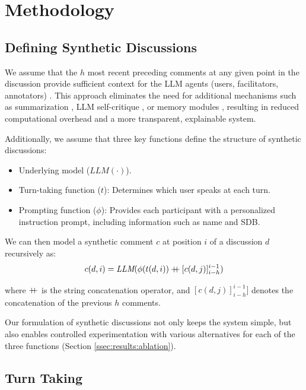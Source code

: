 %

\section{Methodology}
\label{sec:methodology}

\subsection{Defining Synthetic Discussions}
\label{ssec:methodology:discussions}

We assume that the $h$ most recent preceding comments at any given point in the discussion provide sufficient context for the \ac{LLM} agents (users, facilitators, annotators) \cite{pavlopoulos_2020_toxicity}. This approach eliminates the need for additional mechanisms such as summarization \cite{balog_2024}, \ac{LLM} self-critique \cite{yu_2024_fincon}, or memory modules \cite{Vezhnevets2023GenerativeAM}, resulting in reduced computational overhead and a more transparent, explainable system.

Additionally, we assume that three key functions define the structure of synthetic discussions:
\begin{itemize}[nosep, noitemsep]
    \item Underlying model ($\textit{LLM}(\cdot)$).
    \item Turn-taking function ($t$): Determines which user speaks at each turn.
    \item Prompting function ($\phi$): Provides each participant with a personalized instruction prompt, including information such as name and \ac{SDB}.
\end{itemize}

We can then model a synthetic comment $c$ at position $i$ of a discussion $d$ recursively as:
\begin{equation}
\label{eq:comment}
    c(d, i) = \textit{LLM}(\phi(t(d, i)) \mathbin{{+}\mspace{-8mu}{+}} [c(d, j)]^{i-1}_{i-h})
\end{equation}

\noindent where $\mathbin{{+}\mspace{-8mu}{+}}$ is the string concatenation operator, and $[c(d,j)]_{i-h}^{i-1}]$ denotes the concatenation of the previous $h$ comments.

Our formulation of synthetic discussions not only keeps the system simple, but also enables controlled experimentation with various alternatives for each of the three functions (Section \ref{ssec:results:ablation}).


\subsection{Turn Taking}
\label{ssec:methodology:turn}

